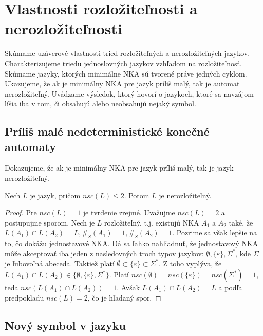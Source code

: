 \chapter[Rozložiteľnosť a nerozložiteľnosť]{Vlastnosti rozložiteľnosti a nerozložiteľnosti}
\label{kap:properties}

Skúmame uzáverové vlastnosti tried rozložiteľných a nerozložiteľných jazykov. Charakterizujeme triedu jednoslovných jazykov vzhľadom na rozložiteľnosť. Skúmame jazyky, ktorých minimálne NKA sú tvorené práve jedných cyklom. Ukazujeme, že ak je minimálny NKA pre jazyk príliš malý, tak je automat nerozložiteľný. Uvádzame výsledok, ktorý hovorí o jazykoch, ktoré sa navzájom líšia iba v tom, či obsahujú alebo neobsahujú nejaký symbol.

\section{Príliš malé nedeterministické konečné automaty}

Dokazujeme, že ak je minimálny NKA pre jazyk príliš malý, tak je jazyk nerozložiteľný.

\begin{theorem}
\label{thm:too_small_nsc}
Nech $ L $ je jazyk, pričom $ nsc(L) \leq 2 $. Potom $ L $ je nerozložiteľný.
\end{theorem}

\begin{proof}
Pre $ nsc(L) = 1 $ je tvrdenie zrejmé. Uvažujme $ nsc(L)=2 $ a postupujme sporom. Nech je $ L $ rozložiteľný, t.j. existujú NKA $ A_1 $ a $ A_2 $ také, že $ L(A_1) \cap L(A_2) = L, \#_S(A_1)=1, \#_S(A_2)=1 $. Pozrime sa však lepšie na to, čo dokážu jednostavové NKA. Dá sa ľahko nahliadnuť, že jednostavový NKA môže akceptovať iba jeden z nasledovných troch typov jazykov: $ \emptyset, \lbrace \varepsilon \rbrace, \Sigma^* $, kde $ \Sigma $ je ľubovoľná abeceda. Taktiež platí $ \emptyset \subset \lbrace \varepsilon \rbrace \subset \Sigma^* $. Z toho vyplýva, že $ L(A_1) \cap L(A_2) \in \lbrace \emptyset, \lbrace \varepsilon \rbrace, \Sigma^* \rbrace $. Platí $ nsc(\emptyset)=nsc(\lbrace \varepsilon \rbrace)=nsc(\Sigma^*)=1 $, teda $ nsc(L(A_1) \cap L(A_2))=1 $. Avšak $ L(A_1) \cap L(A_2) = L $ a podľa predpokladu $ nsc(L)=2 $, čo je hľadaný spor.
\end{proof}

\section{Nový symbol v jazyku}

